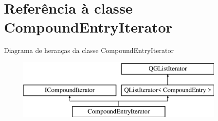 \hypertarget{class_compound_entry_iterator}{\section{Referência à classe Compound\-Entry\-Iterator}
\label{class_compound_entry_iterator}
}
Diagrama de heranças da classe Compound\-Entry\-Iterator\begin{figure}[H]
\begin{center}
\leavevmode
\includegraphics[height=3.000000cm]{class_compound_entry_iterator}
\end{center}
\end{figure}
